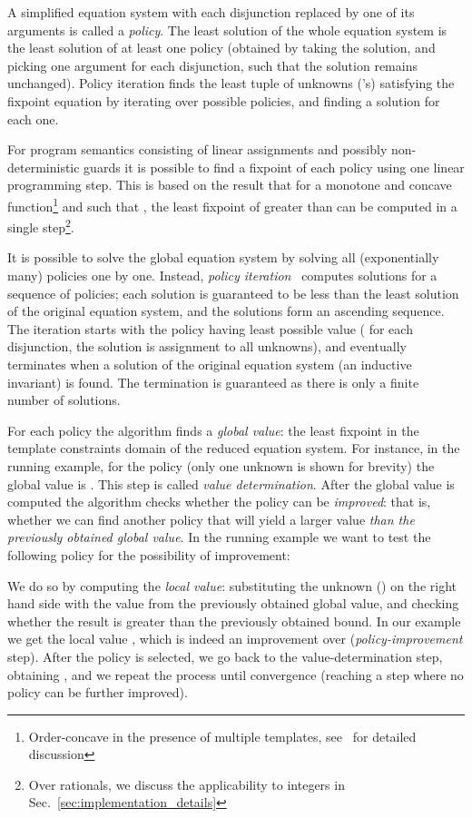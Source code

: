 \documentclass{llncs}
\begin{document}
A simplified equation system with each disjunction replaced by 
one of its arguments is called a \emph{policy}.
The least solution of the whole equation system is the least solution of at
least one policy
(obtained by taking the solution, and picking one argument for each disjunction,
such that the solution remains unchanged).
Policy iteration finds the least tuple of unknowns ('s)
satisfying the fixpoint equation by iterating over possible policies, and
finding a solution for each one.

For program semantics consisting of linear assignments and possibly
non-deterministic guards
it is possible to find a fixpoint of each policy using one linear programming
step.
This is based on the result that for a  monotone and concave function\footnote{Order-concave in the presence of multiple templates,
    see~\cite{max_strategy_templates} for detailed discussion}
 and  such that , the least fixpoint of 
greater than  can be computed in a single step\footnote{Over rationals, we discuss the applicability to integers in
    Sec.~\ref{sec:implementation_details}}.

It is possible to solve the global equation system by solving all
(exponentially many) policies one by one.
Instead, \emph{policy iteration}~\cite{max_strategy_templates} computes solutions
for a sequence of policies;
each solution is guaranteed to be less than the least solution of the original equation system,
and the solutions form an ascending sequence.
The iteration starts with the policy having least possible value
( for each disjunction,
the solution is  assignment to all unknowns), and eventually terminates
when a solution of the original equation system (an inductive invariant) is found.
The termination is guaranteed as there is only a finite number of solutions.

For each policy the algorithm finds a \emph{global value}: the least fixpoint in the template
constraints domain of the reduced equation system.
For instance, in the running example, for the policy
 (only one unknown is
shown for brevity) the global value is .
This step is called \emph{value determination}.
After the global value is computed the algorithm checks whether the policy can be
\emph{improved}: that is, whether we can find another policy that will yield a
larger value \emph{than the previously obtained global value}.
In the running example we want to test the following policy
for the possibility of improvement:

We do so by computing the \emph{local value}: substituting the unknown () on the
right hand side with the value from the previously obtained global value, and
checking whether the result is greater than the previously obtained bound.
In our example we get the local value , which is indeed an
improvement over  (\emph{policy-improvement} step).
After the policy is selected, we go back to the value-determination step, obtaining
, and we repeat the process until convergence (reaching a step where no
policy can be further improved).
\end{document}
